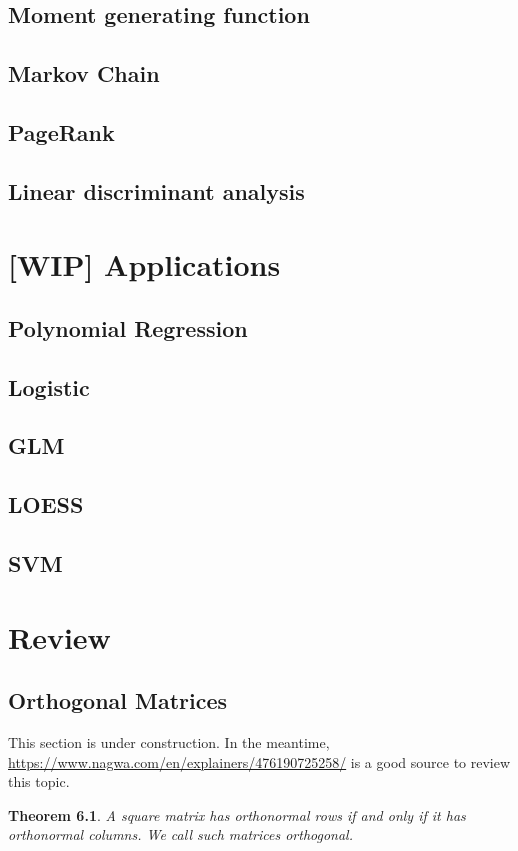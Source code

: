 \documentclass{amsbook}
\newtheorem{theorem}{Theorem}
\begin{document}
\section{Moment generating function}
\section{Markov Chain}
\section{PageRank}
\section{Linear discriminant analysis}

\chapter{[WIP] Applications}
\section{Polynomial Regression}
\section{Logistic}
\section{GLM}
\section{LOESS}
\section{SVM}

\chapter{Review}

\section{Orthogonal Matrices}\label{OrthogonalMatrices}

This section is under construction.  In the meantime, \url{https://www.nagwa.com/en/explainers/476190725258/} is a good source to review this topic.

\begin{theorem}\label{OrthogonalMatrixDefinition}
A square matrix has orthonormal rows if and only if it has orthonormal columns.  We call such matrices {\em orthogonal}.
\end{theorem}
\end{document}
